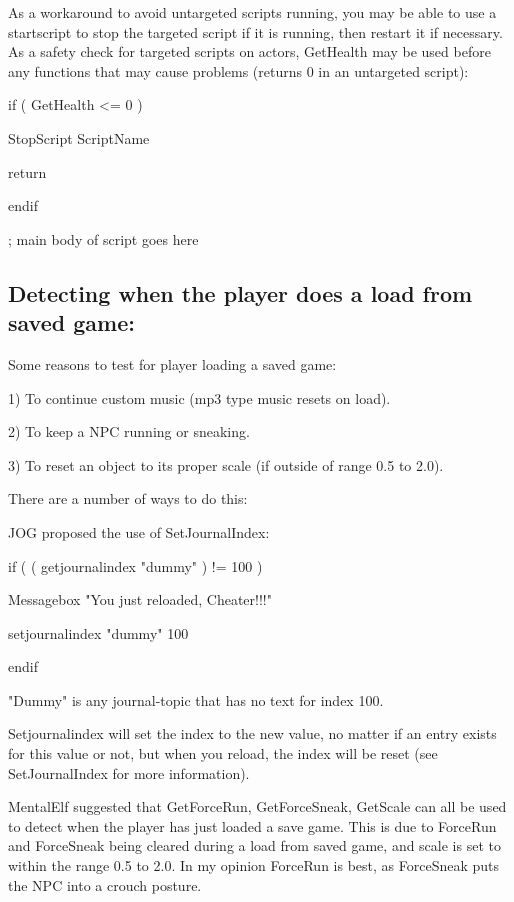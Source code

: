 \documentclass[
]{article}
\begin{document}
As a workaround to avoid untargeted scripts running, you may be able to
use a startscript to stop the targeted script if it is running, then
restart it if necessary. As a safety check for targeted scripts on
actors, GetHealth may be used before any functions that may cause
problems (returns 0 in an untargeted script):

if ( GetHealth \textless= 0 )

StopScript ScriptName

return

endif

; main body of script goes here

\hypertarget{detecting-when-the-player-does-a-load-from-saved-game}{%
\subsection{Detecting when the player does a load from saved
game:}\label{detecting-when-the-player-does-a-load-from-saved-game}}

Some reasons to test for player loading a saved game:

1) To continue custom music (mp3 type music resets on load).

2) To keep a NPC running or sneaking.

3) To reset an object to its proper scale (if outside of range 0.5 to
2.0).

There are a number of ways to do this:

JOG proposed the use of SetJournalIndex:

if ( ( getjournalindex "dummy" ) != 100 )

Messagebox "You just reloaded, Cheater!!!"

setjournalindex "dummy" 100

endif

"Dummy" is any journal-topic that has no text for index 100.

Setjournalindex will set the index to the new value, no matter if an
entry exists for this value or not, but when you reload, the index will
be reset (see SetJournalIndex for more information).

MentalElf suggested that GetForceRun, GetForceSneak, GetScale can all be
used to detect when the player has just loaded a save game. This is due
to ForceRun and ForceSneak being cleared during a load from saved game,
and scale is set to within the range 0.5 to 2.0. In my opinion ForceRun
is best, as ForceSneak puts the NPC into a crouch posture.
\end{document}

